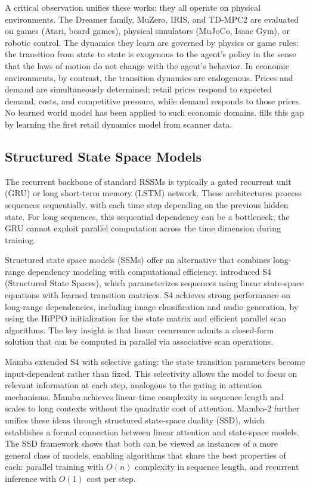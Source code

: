A critical observation unifies these works: they all operate on physical environments. The Dreamer family, MuZero, IRIS, and TD-MPC2 are evaluated on games (Atari, board games), physical simulators (MuJoCo, Isaac Gym), or robotic control. The dynamics they learn are governed by physics or game rules: the transition from state to state is exogenous to the agent's policy in the sense that the laws of motion do not change with the agent's behavior. In economic environments, by contrast, the transition dynamics are endogenous. Prices and demand are simultaneously determined; retail prices respond to expected demand, costs, and competitive pressure, while demand responds to those prices. No learned world model has been applied to such economic domains. \dreamprice{} fills this gap by learning the first retail dynamics model from scanner data.

\subsection{Structured State Space Models}

The recurrent backbone of standard RSSMs is typically a gated recurrent unit (GRU) or long short-term memory (LSTM) network. These architectures process sequences sequentially, with each time step depending on the previous hidden state. For long sequences, this sequential dependency can be a bottleneck; the GRU cannot exploit parallel computation across the time dimension during training.

Structured state space models (SSMs) offer an alternative that combines long-range dependency modeling with computational efficiency. \citet{gu2022s4} introduced S4 (Structured State Spaces), which parameterizes sequences using linear state-space equations with learned transition matrices. S4 achieves strong performance on long-range dependencies, including image classification and audio generation, by using the HiPPO initialization for the state matrix and efficient parallel scan algorithms. The key insight is that linear recurrence admits a closed-form solution that can be computed in parallel via associative scan operations.

Mamba \citep{gu2024mamba} extended S4 with selective gating: the state transition parameters become input-dependent rather than fixed. This selectivity allows the model to focus on relevant information at each step, analogous to the gating in attention mechanisms. Mamba achieves linear-time complexity in sequence length and scales to long contexts without the quadratic cost of attention. Mamba-2 \citep{dao2024mamba2} further unifies these ideas through structured state-space duality (SSD), which establishes a formal connection between linear attention and state-space models. The SSD framework shows that both can be viewed as instances of a more general class of models, enabling algorithms that share the best properties of each: parallel training with $O(n)$ complexity in sequence length, and recurrent inference with $O(1)$ cost per step.

